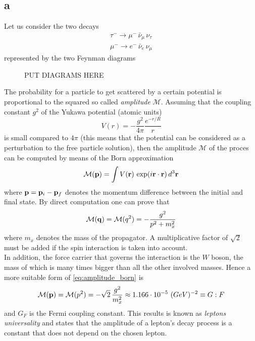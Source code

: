 \subsection*{a}
Let us consider the two decays 
\begin{gather*}
    \tau^- \rightarrow \mu^- \, \bar\nu_{\mu} \, \nu_{\tau} \\
    \mu^- \rightarrow e^- \, \bar\nu_e \, \nu_{\mu}
\end{gather*}
represented by the two Feynman diagrams
\begin{figure}
    PUT DIAGRAMS HERE
\end{figure}
The probability for a particle to get scattered by a certain potential is proportional to the squared so called \emph{amplitude} $\mathcal{M}$.
Assuming that the coupling constant $g^2$ of the Yukawa potential (atomic units)
\begin{equation*}
    V(r) = -\frac{g^2}{4\pi} \frac{e^{-r/R}}{r}
\end{equation*}
is small compared to $4\pi$ (this means that the potential can be considered as a perturbation to the free particle solution), then the amplitude $\mathcal{M}$ of the proces can be computed by means of the Born approximation
\begin{equation*}
    \mathcal{M}(\mathbf{p}) = \int V(\mathbf{r}) \, \exp(i\mathbf{r}\cdot\mathbf{r}) \, d^3\mathbf{r}
\end{equation*}
where $\mathbf{p} = \mathbf{p}_i - \mathbf{p}_f$ denotes the momentum difference between the initial and final state. By direct computation one can prove that 
\begin{equation}
    \mathcal{M}(\mathbf{q}) = \mathcal{M}(q^2) = - \frac{g^2}{p^2 + m_x^2}
    \label{eq:amplitude_born}
\end{equation}
where $m_x$ denotes the mass of the propagator. A multiplicative factor of $\sqrt{2}$ must be added if the spin interaction is taken into account. \\
In addition, the force carrier that governs the interaction is the $W$ boson, the mass of which is many times bigger than all the other involved masses. Hence a more suitable form of 
\ref{eq:amplitude_born} is 
\begin{equation*}
    \mathcal{M}(\mathbf{p}) = \mathcal{M}(p^2) = - \sqrt{2} \, \frac{g^2}{m_x^2} \approx 1.166 \cdot 10^{-5}~(GeV)^{-2} \equiv G:F
\end{equation*}
and $G_F$ is the Fermi coupling constant.
This results is known as \emph{leptons universality} and states that the amplitude of a lepton's decay process is a constant that does not depend on the chosen lepton. \\
